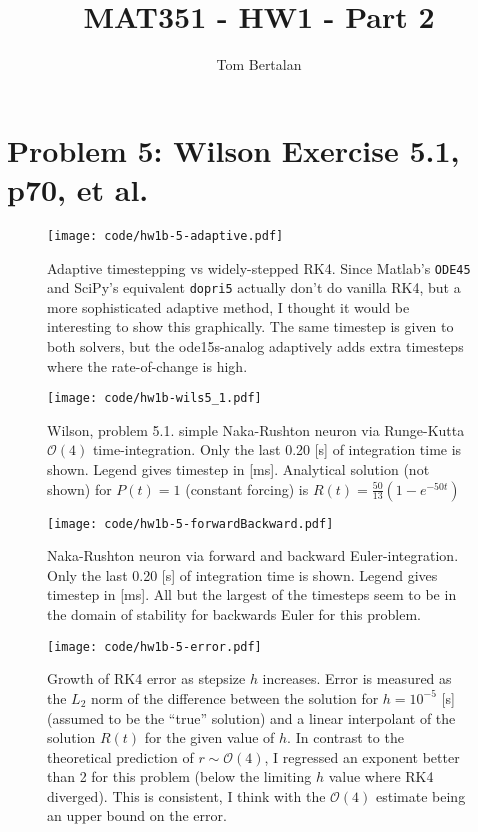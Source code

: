 \documentclass{tufte-handout}
\title{MAT351 - HW1 - Part 2}
\author{Tom Bertalan}
\begin{document}
\maketitle
\tableofcontents

\newpage
\section{Problem 5: Wilson Exercise 5.1, p70, et al.}
\begin{figure}[ht]
 \texttt{[image: code/hw1b-5-adaptive.pdf]}
 \caption{Adaptive timestepping vs widely-stepped RK4. Since Matlab's 
\texttt{ODE45} and SciPy's equivalent \texttt{dopri5} actually don't do 
vanilla RK4, but a more sophisticated adaptive method, I thought it would be 
interesting to show this graphically. The same timestep is given to both 
solvers, but the ode15s-analog adaptively adds extra timesteps where the 
rate-of-change is high.\label{fig:adaptive}}
\end{figure}
\begin{figure}[ht]
 \texttt{[image: code/hw1b-wils5\_1.pdf]}
 \caption{Wilson, problem 5.1. simple Naka-Rushton neuron via Runge-Kutta 
$\mathcal O(4)$ time-integration.
Only the last 0.20 [s] of integration time is shown.
Legend gives timestep in [ms].
Analytical solution (not shown) for $P(t)=1$ (constant forcing) is $R(t) = 
\frac{50}{13}(1 - e^{-50t})$
\label{fig:wils}}
\end{figure}
\begin{figure}[ht]
 \texttt{[image: code/hw1b-5-forwardBackward.pdf]}
 \caption{Naka-Rushton neuron via forward and backward Euler-integration.
Only the last 0.20 [s] of integration time is shown.
Legend gives timestep in [ms]. All but the largest of the timesteps seem to be 
in the domain of stability for backwards Euler for this problem.
\label{fig:fb}}
\end{figure}
\begin{figure}[ht]
 \texttt{[image: code/hw1b-5-error.pdf]}
 \caption{Growth of RK4 error as stepsize $h$ increases. Error is measured as 
the $L_2$ norm of the difference between the solution for $h=10^{-5}$ [s] 
(assumed to be the ``true'' solution) and a linear interpolant of the 
solution $R(t)$ for the given value of $h$. In contrast to the theoretical 
prediction of $r\sim\mathcal O(4)$, I regressed an exponent better than 2 for 
this problem (below the limiting $h$ value where RK4 diverged). This is 
consistent, I think with the $\mathcal O(4)$ estimate being an upper bound on 
the error.
\label{fig:fb}}
\end{figure}
\newpage
\end{document}
